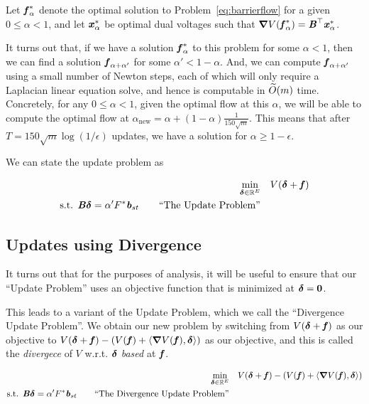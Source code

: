 Let $\boldsymbol{\mathit{f}}^*_{\alpha}$ denote the optimal solution to
Problem~\ref{eq:barrierflow} for a given $0 \leq \alpha < 1$,
and let $\boldsymbol{\mathit{x}}^*_{\alpha}$ be optimal dual voltages such that $\boldsymbol{\nabla} V(\boldsymbol{\mathit{f}}^*_{\alpha}) = \boldsymbol{\mathit{B}}^{\top} \boldsymbol{\mathit{x}}^*_{\alpha}$.

It turns out that, if we have a solution $\boldsymbol{\mathit{f}}^*_{\alpha}$ to this problem for some
$\alpha < 1$, then we can find a solution $\boldsymbol{\mathit{f}}_{\alpha+\alpha'}$ for
some $\alpha' < 1-\alpha$.
And, we can compute $\boldsymbol{\mathit{f}}_{\alpha+\alpha'}$ using a small number of Newton
steps, each of which will only require a Laplacian linear equation
solve, and hence is computable in $\widetilde{O}(m)$ time.
Concretely, for any $0 \leq \alpha < 1$,
given the optimal flow at this $\alpha$, we will be able to compute
the optimal flow at $\alpha_{\text{new}} = \alpha + (1-\alpha)
\frac{1}{150\sqrt{m}}$.
This means that after $T = 150\sqrt{m}\log(1/\epsilon)$ updates, we have a solution
for $\alpha \geq 1-\epsilon$.

We can state the update problem as 

\begin{align}
 \label{eq:updateflow}
  \min_{\boldsymbol{\delta} \in \mathbb{R}^E} & \quad 
    V(\boldsymbol{\delta}+\boldsymbol{\mathit{f}})
  \\
\textrm{s.t. }  \boldsymbol{\mathit{B}}\boldsymbol{\delta} = \alpha' F^* \boldsymbol{\mathit{b}}_{st}
  \tag*{``The Update Problem''}
\end{align}

\subsection{Updates using Divergence}

It turns out that for the purposes of analysis, it will be useful to
ensure that our ``Update Problem'' uses an objective function that is
minimized at $\boldsymbol{\delta} = \boldsymbol{0}$.

This leads to a variant of the Update Problem, which we call the
``Divergence Update Problem''.
We obtain our new problem by switching from
$ V(\boldsymbol{\delta}+\boldsymbol{\mathit{f}})$ as our objective to  $V(\boldsymbol{\delta}+\boldsymbol{\mathit{f}})
  -
  (V(\boldsymbol{\mathit{f}})
  +
  \left< \boldsymbol{\nabla} V(\boldsymbol{\mathit{f}}), \boldsymbol{\delta} \right>)$ as our objective, and this is called
  the \emph{divergece} of $V$ w.r.t. $\boldsymbol{\delta}$ \emph{based} at $\boldsymbol{\mathit{f}}$.
  
\begin{align}
 \label{eq:divflow}
  \min_{\boldsymbol{\delta} \in \mathbb{R}^E} & \quad 
    V(\boldsymbol{\delta}+\boldsymbol{\mathit{f}})
  -
  (V(\boldsymbol{\mathit{f}})
  +
  \left< \boldsymbol{\nabla} V(\boldsymbol{\mathit{f}}), \boldsymbol{\delta} \right>)
  \\
\textrm{s.t. }  \boldsymbol{\mathit{B}}\boldsymbol{\delta} = \alpha' F^* \boldsymbol{\mathit{b}}_{st}
  \tag*{``The Divergence Update Problem''}
\end{align}

